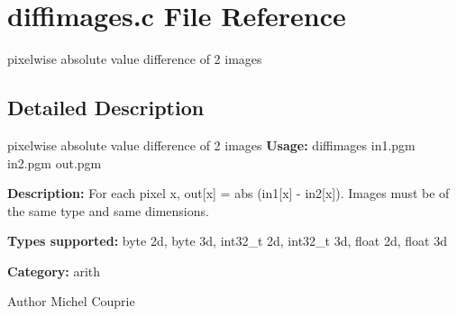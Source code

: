 \section{diffimages.c File Reference}
\label{diffimages_8c}


pixelwise absolute value difference of 2 images  




\subsection{Detailed Description}
pixelwise absolute value difference of 2 images {\bfseries Usage:} diffimages in1.pgm in2.pgm out.pgm

{\bfseries Description:} For each pixel x, out[x] = abs (in1[x] -\/ in2[x]). Images must be of the same type and same dimensions.

{\bfseries Types supported:} byte 2d, byte 3d, int32\_\-t 2d, int32\_\-t 3d, float 2d, float 3d

{\bfseries Category:} arith

\begin{DoxyAuthor}{Author}
Michel Couprie 
\end{DoxyAuthor}
